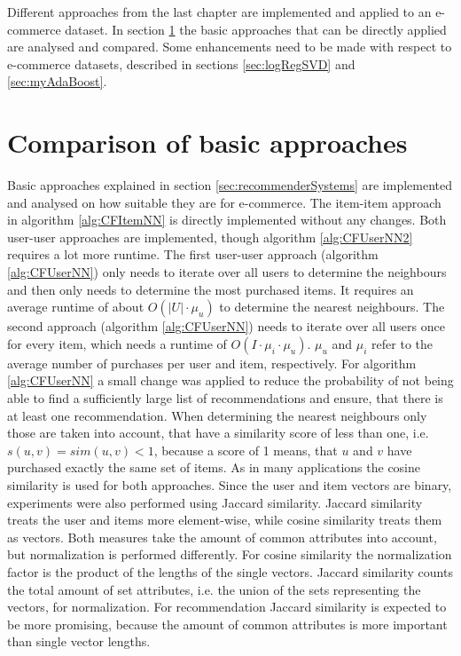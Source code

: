 \documentclass[10pt]{reportMaster}
\begin{document}
Different approaches from the last chapter are implemented and applied to an e-commerce dataset.
In section \ref{sec:comparison} the basic approaches that can be directly applied are analysed and compared.
Some enhancements need to be made with respect to e-commerce datasets, described in sections \ref{sec:logRegSVD} and \ref{sec:myAdaBoost}.


\section{Comparison of basic approaches}
\label{sec:comparison}

Basic approaches explained in section \ref{sec:recommenderSystems} are implemented and analysed on how suitable they are for e-commerce.
The item-item approach in algorithm \ref{alg:CFItemNN} is directly implemented without any changes.
Both user-user approaches are implemented, though algorithm \ref{alg:CFUserNN2} requires a lot more runtime.
The first user-user approach (algorithm \ref{alg:CFUserNN}) only needs to iterate over all users to determine the neighbours and then only needs to determine the most purchased items.
It requires an average runtime of about $O(|U| \cdot \mu_u)$ to determine the nearest neighbours.
The second approach (algorithm \ref{alg:CFUserNN}) needs to iterate over all users once for every item, which needs a runtime of $O(I \cdot \mu_i \cdot \mu_u)$.
$\mu_u$ and $\mu_i$ refer to the average number of purchases per user and item, respectively.
For algorithm \ref{alg:CFUserNN} a small change was applied to reduce the probability of not being able to find a sufficiently large list of recommendations and ensure, that there is at least one recommendation.
When determining the nearest neighbours only those are taken into account, that have a similarity score of less than one, i.e. $s(u,v) = sim(u, v) < 1$, because a score of 1 means, that $u$ and $v$ have purchased exactly the same set of items.
As in many applications the cosine similarity is used for both approaches.
Since the user and item vectors are binary, experiments were also performed using Jaccard similarity.
Jaccard similarity treats the user and items more element-wise, while cosine similarity treats them as vectors.
Both measures take the amount of common attributes into account, but normalization is performed differently.
For cosine similarity the normalization factor is the product of the lengths of the single vectors.
Jaccard similarity counts the total amount of set attributes, i.e. the union of the sets representing the vectors, for normalization.
For recommendation Jaccard similarity is expected to be more promising, because the amount of common attributes is more important than single vector lengths.
\end{document}
